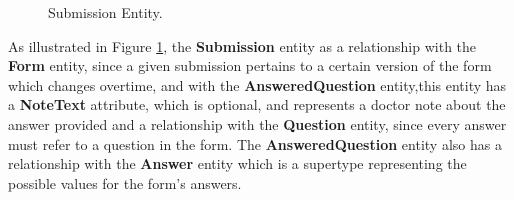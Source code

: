 \begin{figure}[H]
	\begin{center}
	\end{center}
	\caption{Submission Entity.}\label{fig:submission_entity}
\end{figure}

As illustrated in Figure \ref{fig:submission_entity}, the \textbf{Submission} entity as a relationship with the \textbf{Form} entity, since a given submission pertains to a certain version of the form which changes overtime, and with the \textbf{AnsweredQuestion} entity,this entity has a \textbf{NoteText} attribute, which is optional, and represents a doctor note about the answer provided and a relationship with the \textbf{Question} entity, since every answer must refer to a question in the form.
The \textbf{AnsweredQuestion} entity also has a relationship with the \textbf{Answer} entity which is a supertype representing the possible values for the form's answers.



